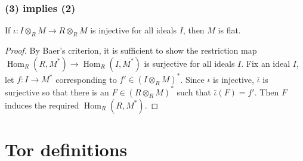 \documentclass[aspectratio=169]{beamer}
\begin{document}
\begin{frame}[fragile]
\frametitle{(3) implies (2)}
\begin{minipage}{0.1\textwidth}
\end{minipage}%
\begin{minipage}{0.9\textwidth}



\begin{corollary}
If $\iota: I\otimes_R M\to R\otimes_R M$ is injective for all ideals $I$, then
$M$ is flat.
\end{corollary}
\begin{proof}
By Baer's criterion, it is sufficient to show the restriction map $\operatorname{Hom}_R(R, M^*)\to \operatorname{Hom}_R(I, M^*)$
is surjective for all ideals $I$. Fix an ideal $I$, let $f : I \to M^*$ corresponding to $f' \in (I\otimes_R M)^*$. Since $\iota$ is injective, $\bar\iota$ is surjective 
so that there is an $F \in (R\otimes_R M)^*$ such that $\bar\iota(F) = f'$. 
Then $F$ induces the required $\operatorname{Hom}_R(R, M^*)$.
\end{proof}
  

\end{minipage}%

\end{frame}

\section*{Tor definitions}
\end{document}
